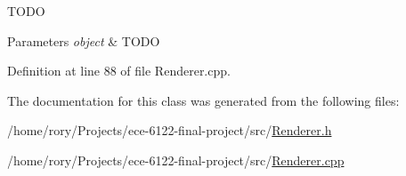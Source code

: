 T\+O\+DO 
\begin{DoxyParams}{Parameters}
{\em object} & T\+O\+DO \\
\hline
\end{DoxyParams}


Definition at line 88 of file Renderer.\+cpp.



The documentation for this class was generated from the following files\+:\begin{DoxyCompactItemize}
\item 
/home/rory/\+Projects/ece-\/6122-\/final-\/project/src/\hyperlink{_renderer_8h}{Renderer.\+h}\item 
/home/rory/\+Projects/ece-\/6122-\/final-\/project/src/\hyperlink{_renderer_8cpp}{Renderer.\+cpp}\end{DoxyCompactItemize}
